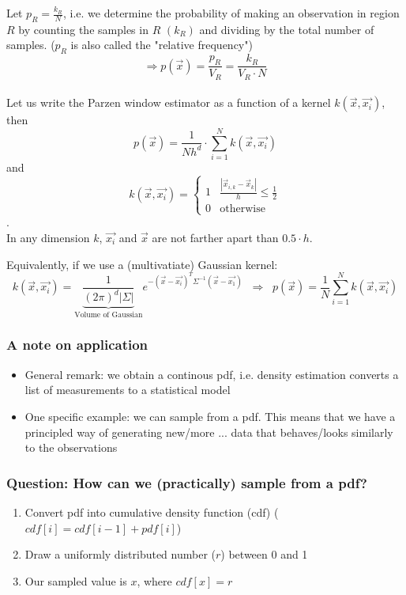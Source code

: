 \documentclass[a4paper]{article}
\begin{document}
Let \(p_R = \frac{k_R}{N}\), i.e. we determine the probability of making an observation in region \(R\) by counting the samples in \(R\) \((k_R)\) and dividing by the total number of samples. (\(p_R\) is also called the "relative frequency")\\
\[\Rightarrow p(\vec{x}) = \frac{p_R}{V_R} = \frac{k_R}{V_R \cdot N}\]\\
Let us write the Parzen window estimator as a function of a kernel \(k(\vec{x},\vec{x_i})\), then
\[p(\vec{x}) = \frac{1}{Nh^d} \cdot \sum\limits_{i=1}^{N} k(\vec{x}, \vec{x_i})\]
and
\[k(\vec{x}, \vec{x_i}) = \begin{cases} 
    1 & \frac{|\vec{x}_{i,k} - \vec{x}_k|}{h} \leq \frac{1}{2} \\ 0 & \text{otherwise}
\end{cases}\].\\
In any dimension \(k\),  \(\vec{x_i}\) and \(\vec{x}\) are not farther apart than \(0.5\cdot h\).

Equivalently, if we use a (multivatiate) Gaussian kernel:
\[ k(\vec{x}, \vec{x_i}) = \underbrace{\frac{1}{(2\pi)^d |\Sigma|}}_{\text{Volume of Gaussian}} e^{-(\vec{x} - \vec{x_i})^T \Sigma^{-1} (\vec{x} - \vec{x_1})} \;\; \Rightarrow \;\; p(\vec{x}) = \frac{1}{N} \sum\limits_{i=1}^{N} k(\vec{x}, \vec{x_i})\]

\subsubsection*{A note on application}
\begin{itemize}
    \item
        General remark: we obtain a continous pdf, i.e. density estimation converts a list of measurements to a statistical model
    \item
        One specific example: we can sample from a pdf. This means that we have a principled way of generating new/more ... data that behaves/looks similarly to the observations
\end{itemize}

\subsubsection*{Question: How can we (practically) sample from a pdf?}
\begin{enumerate}
    \item
        Convert pdf into cumulative density function (cdf) (\( cdf[i] = cdf[i-1] + pdf[i]\))
    \item
        Draw a uniformly distributed number (\(r\)) between 0 and 1
    \item
        Our sampled value is \(x\), where \(cdf[x] = r\)  
\end{enumerate}
\end{document}
